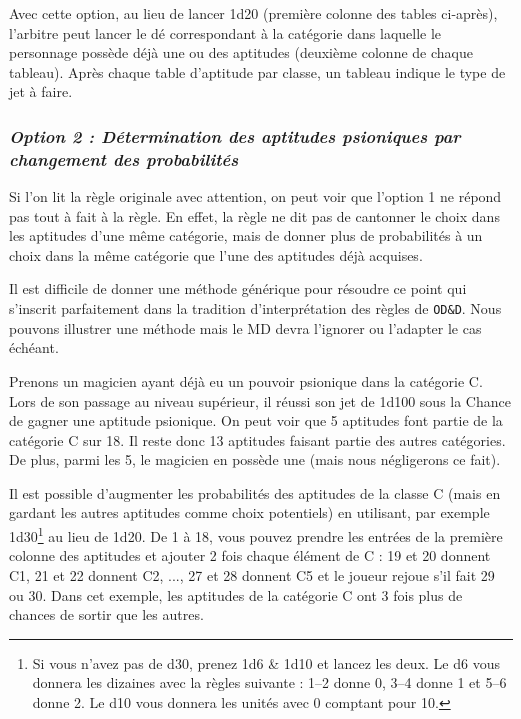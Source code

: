 \bigskip

Avec cette option, au lieu de lancer 1d20 (première colonne des tables ci-après), l'arbitre peut lancer le dé correspondant à la catégorie dans laquelle le personnage possède déjà une ou des aptitudes (deuxième colonne de chaque tableau). Après chaque table d'aptitude par classe, un tableau indique le type de jet à faire.

\subsubsection*{\textit{Option 2 : Détermination des aptitudes psioniques par changement des probabilités}}

Si l'on lit la règle originale avec attention, on peut voir que l'option 1 ne répond pas tout à fait à la règle. En effet, la règle ne dit pas de cantonner le choix dans les aptitudes d'une même catégorie, mais de donner plus de probabilités à un choix dans la même catégorie que l'une des aptitudes déjà acquises.

\bigskip

Il est difficile de donner une méthode générique pour résoudre ce point qui s'inscrit parfaitement dans la tradition d'interprétation des règles de \texttt{OD\&D}. Nous pouvons illustrer une méthode mais le MD devra l'ignorer ou l'adapter le cas échéant.

\bigskip

Prenons un magicien ayant déjà eu un pouvoir psionique dans la catégorie C. Lors de son passage au niveau supérieur, il réussi son jet de 1d100 sous la Chance de gagner une aptitude psionique. On peut voir que 5 aptitudes font partie de la catégorie C sur 18. Il reste donc 13 aptitudes faisant partie des autres catégories. De plus, parmi les 5, le magicien en possède une (mais nous négligerons ce fait).

\bigskip

Il est possible d'augmenter les probabilités des aptitudes de la classe C (mais en gardant les autres aptitudes comme choix potentiels) en utilisant, par exemple 1d30\footnote{Si vous n'avez pas de d30, prenez 1d6 \& 1d10 et lancez les deux. Le d6 vous donnera les dizaines avec la règles suivante : 1--2 donne 0, 3--4 donne 1 et 5--6 donne 2. Le d10 vous donnera les unités avec 0 comptant pour 10.} au lieu de 1d20. De 1 à 18, vous pouvez prendre les entrées de la première colonne des aptitudes et ajouter 2 fois chaque élément de C : 19 et 20 donnent C1, 21 et 22 donnent C2, ..., 27 et 28 donnent C5 et le joueur rejoue s'il fait 29 ou 30. Dans cet exemple, les aptitudes de la catégorie C ont 3 fois plus de chances de sortir que les autres.

